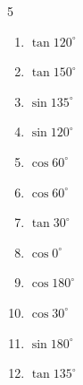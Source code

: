 \begin{multicols}{5}
\begin{enumerate}
        \phantom{$\displaystyle =0$}

  \item $\displaystyle \tan{120^\circ}$


  \item $\displaystyle \tan{150^\circ}$


  \item $\displaystyle \sin{135^\circ}$


  \item $\displaystyle \sin{120^\circ}$


  \item $\displaystyle \cos{60^\circ}$


  \item $\displaystyle \cos{60^\circ}$


  \item $\displaystyle \tan{30^\circ}$


  \item $\displaystyle \cos{0^\circ}$

        \phantom{$\displaystyle =1$}

  \item $\displaystyle \cos{180^\circ}$

        \phantom{$\displaystyle =-1$}

  \item $\displaystyle \cos{30^\circ}$


  \item $\displaystyle \sin{180^\circ}$

        \phantom{$\displaystyle =0$}

  \item $\displaystyle \tan{135^\circ}$

        \phantom{$\displaystyle =-1$}

\columnbreak %


\end{enumerate}
\end{multicols}
